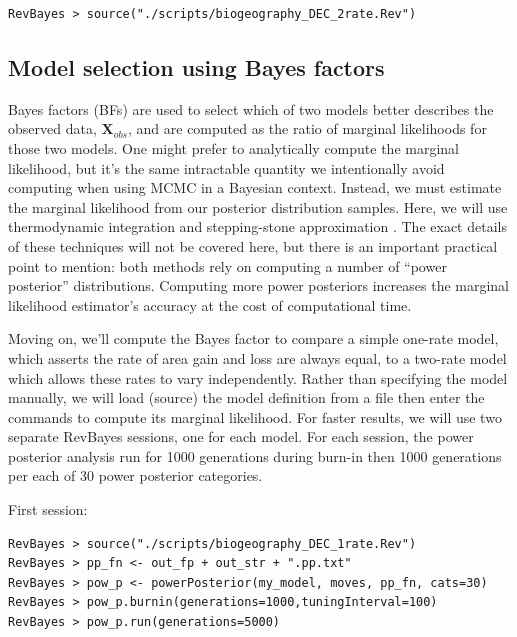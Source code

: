 \begin{snugshade}
\begin{lstlisting}
RevBayes > source("./scripts/biogeography_DEC_2rate.Rev")
\end{lstlisting}
\end{snugshade}

\subsection{Model selection using Bayes factors}

Bayes factors (BFs) are used to select which of two models better describes the observed data, $\mathbf{X}_{obs}$, and are computed as the ratio of marginal likelihoods for those two models.
One might prefer to analytically compute the marginal likelihood, but it's the same intractable quantity we intentionally avoid computing when using MCMC in a Bayesian context.
Instead, we must estimate the marginal likelihood from our posterior distribution samples.
Here, we will use thermodynamic integration \citep{lartillot06} and stepping-stone approximation \citep{xie10}.
The exact details of these techniques will not be covered here, but there is an important practical point to mention: both methods rely on computing a number of ``power posterior'' distributions.
Computing more power posteriors increases the marginal likelihood estimator's accuracy at the cost of computational time.

Moving on, we'll compute the Bayes factor to compare a simple one-rate model, which asserts the rate of area gain and loss are always equal, to a two-rate model which allows these rates to vary independently.
Rather than specifying the model manually, we will load (source) the model definition from a file then enter the commands to compute its marginal likelihood.
For faster results, we will use two separate RevBayes sessions, one for each model.
For each session, the power posterior analysis run for 1000 generations during burn-in then 1000 generations per each of 30 power posterior categories.

First session:
\begin{snugshade}
\begin{lstlisting}
RevBayes > source("./scripts/biogeography_DEC_1rate.Rev")
RevBayes > pp_fn <- out_fp + out_str + ".pp.txt"
RevBayes > pow_p <- powerPosterior(my_model, moves, pp_fn, cats=30) 
RevBayes > pow_p.burnin(generations=1000,tuningInterval=100)
RevBayes > pow_p.run(generations=5000)
\end{lstlisting}
\end{snugshade}

